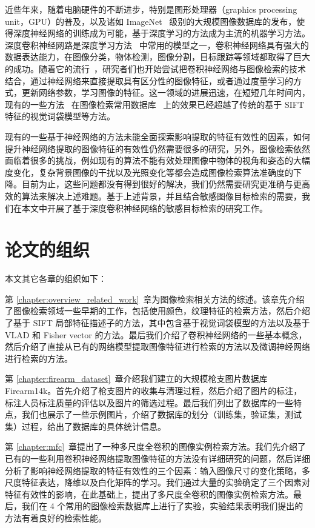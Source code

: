 近些年来，随着电脑硬件的不断进步，特别是图形处理器（graphics processing unit，GPU）的普及，以及诸如 ImageNet~\cite{Russakovsky2015ImageNetLS} 级别的大规模图像数据库的发布，使得深度神经网络的训练成为可能，基于深度学习的方法成为主流的机器学习方法。深度卷积神经网路是深度学习方法~\cite{lecun2015deep} 中常用的模型之一，卷积神经网络具有强大的数据表达能力，在图像分类，物体检测，图像分割，目标跟踪等领域都取得了巨大的成功。随着它的流行~\cite{Krizhevsky2012ImageNetCW}，研究者们也开始尝试把卷积神经网络与图像检索的技术结合，通过神经网络来直接提取具有区分性的图像特征，或者通过度量学习的方式，更新网络参数，学习图像的特征。这一领域的进展迅速，在短短几年时间内，现有的一些方法~\cite{Gordo2016DeepIR} 在图像检索常用数据库~\cite{Philbin2007ObjectRW,Philbin2008LostIQ,Nistr2006ScalableRW,Jgou2008HammingEA} 上的效果已经超越了传统的基于 SIFT 特征的视觉词袋模型等方法。

现有的一些基于神经网络的方法未能全面探索影响提取的特征有效性的因素，如何提升神经网络提取的图像特征的有效性仍然需要很多的研究，另外，图像检索依然面临着很多的挑战，例如现有的算法不能有效处理图像中物体的视角和姿态的大幅度变化，复杂背景图像的干扰以及光照变化等都会造成图像检索算法准确度的下降。目前为止，这些问题都没有得到很好的解决，我们仍然需要研究更准确与更高效的算法来解决上述难题。基于上述背景，并且结合敏感图像目标检索的需要，我们在本文中开展了基于深度卷积神经网络的敏感目标检索的研究工作。

\section{论文的组织}
本文其它各章的组织如下：

第 \ref{chapter:overview_related_work}~章为图像检索相关方法的综述。该章先介绍了图像检索领域一些早期的工作，包括使用颜色，纹理特征的检索方法，然后介绍了基于 SIFT 局部特征描述子的方法，其中包含基于视觉词袋模型的方法以及基于 VLAD 和 Fisher vector 的方法。最后我们介绍了卷积神经网络的一些基本概念，然后介绍了直接从已有的网络模型提取图像特征进行检索的方法以及微调神经网络进行检索的方法。

第 \ref{chapter:firearm_dataset}~章介绍我们建立的大规模枪支图片数据库 Firearm14k。首先介绍了枪支图片的收集与清理过程，然后介绍了图片的标注，标注人员标注质量的评估以及图片的筛选过程。最后我们列出了数据库的一些特点，我们也展示了一些示例图片，介绍了数据库的划分（训练集，验证集，测试集）过程，给出了数据库的具体统计信息。

第 \ref{chapter:mfc}~章提出了一种多尺度全卷积的图像实例检索方法。我们先介绍了已有的一些利用卷积神经网络提取图像特征的方法没有详细研究的问题，然后详细分析了影响神经网络提取的特征有效性的三个因素：输入图像尺寸的变化策略，多尺度特征表达，降维以及白化矩阵的学习。我们通过大量的实验确定了三个因素对特征有效性的影响，在此基础上，提出了多尺度全卷积的图像实例检索方法。最后，我们在 4 个常用的图像检索数据库上进行了实验，实验结果表明我们提出的方法有着良好的检索性能。

